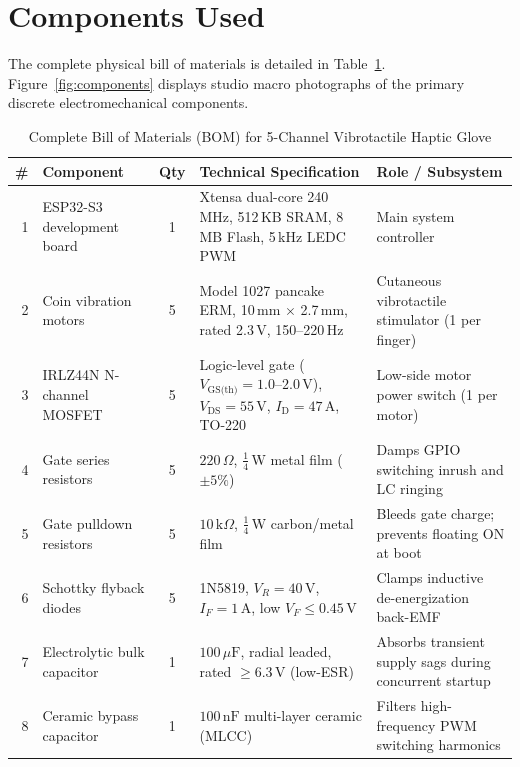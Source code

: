 \documentclass[10pt,twocolumn]{article}
\begin{document}
\section{Components Used}
The complete physical bill of materials is detailed in Table~\ref{tab:bom}. Figure~\ref{fig:components} displays studio macro photographs of the primary discrete electromechanical components.

\begin{table}[t]
\centering
\caption{Complete Bill of Materials (BOM) for 5-Channel Vibrotactile Haptic Glove}
\label{tab:bom}
\small
\begin{tabularx}{\textwidth}{r p{4.2cm} c p{6.8cm} X}
\toprule
\textbf{\#} & \textbf{Component} & \textbf{Qty} & \textbf{Technical Specification} & \textbf{Role / Subsystem} \\
\midrule
1  & ESP32-S3 development board      & 1     & Xtensa dual-core 240\,MHz, 512\,KB SRAM, 8\,MB Flash, 5\,kHz LEDC PWM & Main system controller \\
2  & Coin vibration motors           & 5     & Model 1027 pancake ERM, 10\,mm $\times$ 2.7\,mm, rated 2.3\,V, 150--220\,Hz & Cutaneous vibrotactile stimulator (1 per finger) \\
3  & IRLZ44N N-channel MOSFET        & 5     & Logic-level gate ($V_{\text{GS(th)}} = 1.0$--$2.0$\,V), $V_{\text{DS}} = 55$\,V, $I_{\text{D}} = 47$\,A, TO-220 & Low-side motor power switch (1 per motor) \\
4  & Gate series resistors           & 5     & $220\,\Omega$, $\frac{1}{4}$\,W metal film ($\pm 5\%$) & Damps GPIO switching inrush and LC ringing \\
5  & Gate pulldown resistors         & 5     & $10\,\text{k}\Omega$, $\frac{1}{4}$\,W carbon/metal film & Bleeds gate charge; prevents floating ON at boot \\
6  & Schottky flyback diodes         & 5     & 1N5819, $V_R = 40$\,V, $I_F = 1$\,A, low $V_F \le 0.45$\,V & Clamps inductive de-energization back-EMF \\
7  & Electrolytic bulk capacitor     & 1     & $100\,\mu\text{F}$, radial leaded, rated $\ge 6.3$\,V (low-ESR) & Absorbs transient supply sags during concurrent startup \\
8  & Ceramic bypass capacitor        & 1     & $100\,\text{nF}$ multi-layer ceramic (MLCC) & Filters high-frequency PWM switching harmonics \\

\end{tabularx}
\end{table}
\end{document}
